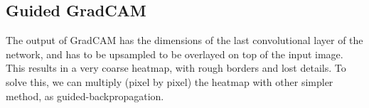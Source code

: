 \subsection{Guided GradCAM}

The output of GradCAM has the dimensions of the last convolutional layer of the network, and has to be upsampled to be overlayed on top of the input image. This results in a very coarse heatmap, with rough borders and lost details. To solve this, we can multiply (pixel by pixel) the heatmap with other simpler method, as guided-backpropagation. 


